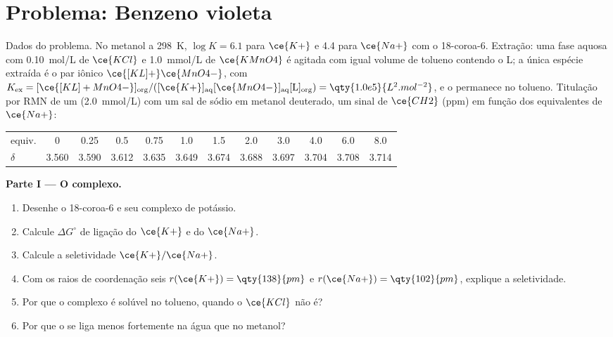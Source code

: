 \section{Problema: Benzeno violeta}

\begin{problem}
\label{pb:b3:supramolecular:1}
Dados do problema. No metanol a \qty{298}{K}, $\log K = 6.1$ para $\ce{K+}$ e 4.4 para $\ce{Na+}$ com o
18-coroa-6. Extração: uma fase aquosa com \qty{0.10}{mol/L} de $\ce{KCl}$ e \qty{1.0}{mmol/L} de $\ce{KMnO4}$ é agitada
com igual volume de tolueno contendo o  L; a única espécie
extraída é o par iônico $\ce{[KL]+}\ce{MnO4-}$, com
$K_{\mathrm{ex}} = [\ce{[KL]+MnO4-}]_{\mathrm{org}}/([\ce{K+}]_{\mathrm{aq}}[\ce{MnO4-}]_{\mathrm{aq}}[\mathrm L]_{\mathrm{org}}) = \qty{1.0e5}{L^2.mol^{-2}}$, e o  permanece no tolueno. Titulação por RMN de um
 (\qty{2.0}{mmol/L}) com um sal de sódio em metanol deuterado, um sinal de $\ce{CH2}$
(ppm) em função dos equivalentes de $\ce{Na+}$:

\begin{center}\small
\begin{tabular}{l*{11}{c}}
\hline
equiv. & 0 & 0.25 & 0.5 & 0.75 & 1.0 & 1.5 & 2.0 & 3.0 & 4.0 & 6.0 & 8.0\\
$\delta$ & 3.560 & 3.590 & 3.612 & 3.635 & 3.649 & 3.674 & 3.688 & 3.697 & 3.704 & 3.708 & 3.714\\
\hline
\end{tabular}
\end{center}

\medskip\noindent\textbf{Parte I --- O complexo.}
\begin{enumerate}
  \item Desenhe o 18-coroa-6 e seu complexo de potássio.
  \item Calcule $\Delta G^\circ$ de ligação do $\ce{K+}$ e do $\ce{Na+}$.
  \item Calcule a seletividade $\ce{K+}/\ce{Na+}$.
  \item Com os raios de coordenação seis $r(\ce{K+}) = \qty{138}{pm}$ e $r(\ce{Na+}) = \qty{102}{pm}$, explique a seletividade.
  \item Por que o complexo é solúvel no tolueno, quando o $\ce{KCl}$ não é?
  \item Por que o  se liga menos fortemente na água que no metanol?
\end{enumerate}


\end{problem}
